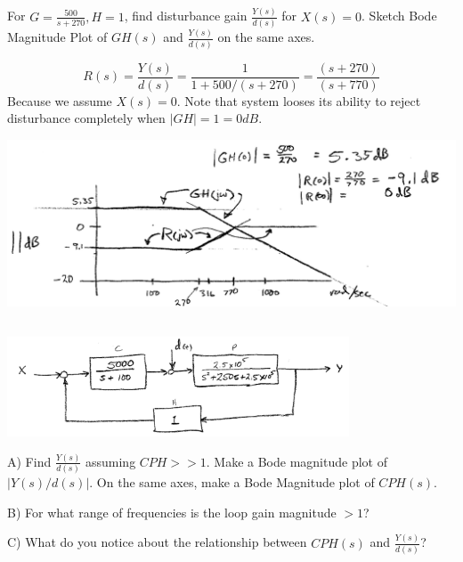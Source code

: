 \documentclass{article}	%
\begin{document}
\subsection{} For $G = \frac{500}{s+270}, H=1$, find disturbance gain $\frac{Y(s)}{d(s)}$ for $X(s)=0$.  Sketch Bode Magnitude Plot of $GH(s)$ and $\frac{Y(s)}{d(s)}$ on the same axes.

\begin{solution}
\[
R(s) = \frac{Y(s)}{d(s)} = \frac{1}{1+500/(s+270)} = \frac{(s+270)}{(s+770)}
\]
Because we assume $X(s)=0$.
Note that system looses its ability to reject disturbance completely when $|GH| = 1 = 0dB$.

\includegraphics[width=6.0in]{00564a.png}
\end{solution}



\subsection{}
 \includegraphics[width=4.0in]{00470a.png}

A) Find $\frac{Y(s)}{d(s)}$ assuming $CPH>>1$. Make a Bode magnitude plot of $|Y(s)/d(s)|$.
On the same axes, make a Bode Magnitude plot of $CPH(s)$.

B) For what range of frequencies is the loop gain magnitude $>1$?

C) What do you notice about the relationship between $CPH(s)$ and $\frac{Y(s)}{d(s)}$?
\end{document}
